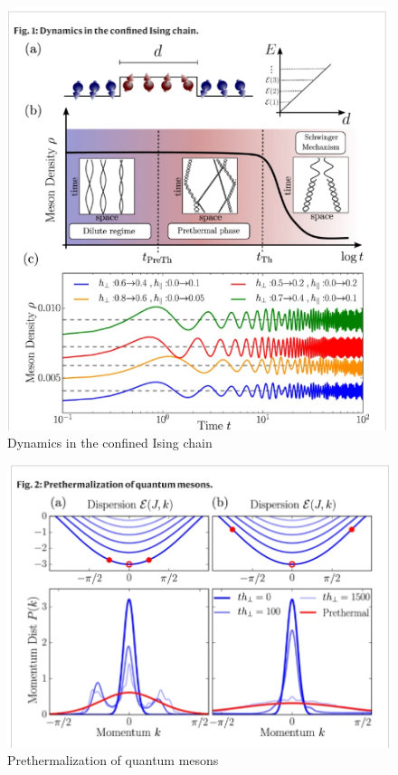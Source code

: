 \documentclass{article}
\begin{document}
\begin{figure}
\centering
\includegraphics[scale=1]{thermoimg}
\caption{\label{fig1}Dynamics in the confined Ising chain}
\end{figure}

\begin{figure}
\centering
\includegraphics[scale=0.5]{secondimg}
\caption{\label{fig2}Prethermalization of quantum mesons}
\end{figure}
\end{document}
